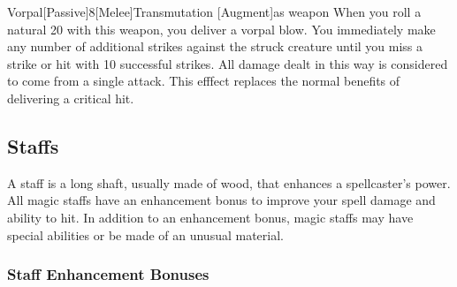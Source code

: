             \begin{magicitemdef}{Vorpal}[Passive]{8}[Melee]{Transmutation [Augment]}{as weapon}
                 When you roll a natural 20 with this weapon, you deliver a vorpal blow.
                You immediately make any number of additional strikes against the struck creature until you miss a strike or hit with 10 successful strikes.
                All damage dealt in this way is considered to come from a single attack.
                This efffect replaces the normal benefits of delivering a critical hit.
            \end{magicitemdef}

\begin{comment}
            \subsection{Rods}

                Rods are scepterlike devices that have unique magical powers and do not usually have charges.
                Anyone can use a rod.

                \parhead{Physical Description} Rods weigh approximately 5 pounds.

                They range from 2 feet to 3 feet long and are usually made of iron or some other metal.
                (Many, as noted in their descriptions, can function as light maces or clubs due to their sturdy construction.)

                These sturdy items have AC 9, 10 hit points, hardness 10, and a break DR of 27.

                \parhead{Activation} Details relating to rod use vary from item to item.
                See the individual descriptions for specifics.
\end{comment}

        \subsection{Staffs}

            A staff is a long shaft, usually made of wood, that enhances a spellcaster's power.
            All magic staffs have an enhancement bonus to improve your spell damage and ability to hit.
            In addition to an enhancement bonus, magic staffs may have special abilities or be made of an unusual material.

            \subsubsection{Staff Enhancement Bonuses}\label{Staff Enhancement Bonuses}

